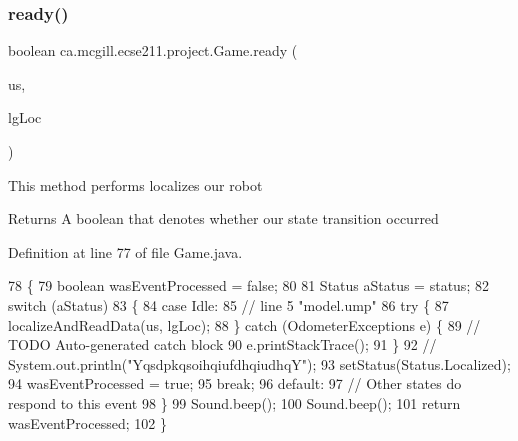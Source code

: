 \subsubsection{\texorpdfstring{ready()}{ready()}}
{\footnotesize\ttfamily boolean ca.\+mcgill.\+ecse211.\+project.\+Game.\+ready (\begin{DoxyParamCaption}\item[{\hyperlink{classca_1_1mcgill_1_1ecse211_1_1localization_1_1_ultrasonic_localizer}{Ultrasonic\+Localizer}}]{us,  }\item[{\hyperlink{classca_1_1mcgill_1_1ecse211_1_1localization_1_1_light_localizer}{Light\+Localizer}}]{lg\+Loc }\end{DoxyParamCaption})}

This method performs localizes our robot

\begin{DoxyReturn}{Returns}
A boolean that denotes whether our state transition occurred 
\end{DoxyReturn}


Definition at line 77 of file Game.\+java.


\begin{DoxyCode}
78   \{
79     \textcolor{keywordtype}{boolean} wasEventProcessed = \textcolor{keyword}{false};
80     
81     Status aStatus = status;
82     \textcolor{keywordflow}{switch} (aStatus)
83     \{
84       \textcolor{keywordflow}{case} Idle:
85         \textcolor{comment}{// line 5 "model.ump"}
86         \textcolor{keywordflow}{try} \{
87           localizeAndReadData(us, lgLoc);
88         \} \textcolor{keywordflow}{catch} (OdometerExceptions e) \{
89           \textcolor{comment}{// TODO Auto-generated catch block}
90           e.printStackTrace();
91         \}
92     \textcolor{comment}{//    System.out.println("YqsdpkqsoihqiufdhqiudhqY");}
93         setStatus(Status.Localized);
94         wasEventProcessed = \textcolor{keyword}{true};
95         \textcolor{keywordflow}{break};
96       \textcolor{keywordflow}{default}:
97         \textcolor{comment}{// Other states do respond to this event}
98     \}
99     Sound.beep();
100     Sound.beep();
101     \textcolor{keywordflow}{return} wasEventProcessed;
102   \}
\end{DoxyCode}
\mbox{\label{enumca_1_1mcgill_1_1ecse211_1_1project_1_1_game_adf69abe44e952d627fb9e6a2f678cb5e}} 
